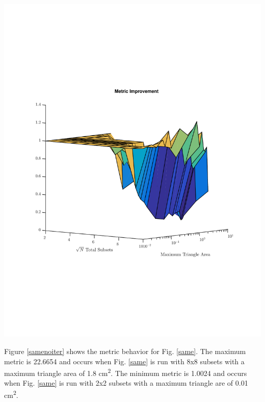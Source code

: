 \noindent\begin{minipage}{\textwidth}
\centering
\includegraphics[scale=0.78, trim = 2cm 6cm 2cm 7cm,clip]{figures/OppDiff.pdf}
\label{oppdiff}
\end{minipage}
\smallskip

Figure \ref{samenoiter} shows the metric behavior for Fig. \ref{same}. The maximum metric is 22.6654 and occurs when Fig. \ref{same} is run with 8x8 subsets with a maximum triangle area of 1.8 cm\textsuperscript{2}. The minimum metric is 1.0024 and occurs when Fig. \ref{same} is run with 2x2 subsets with a maximum triangle are of 0.01 cm\textsuperscript{2}.

